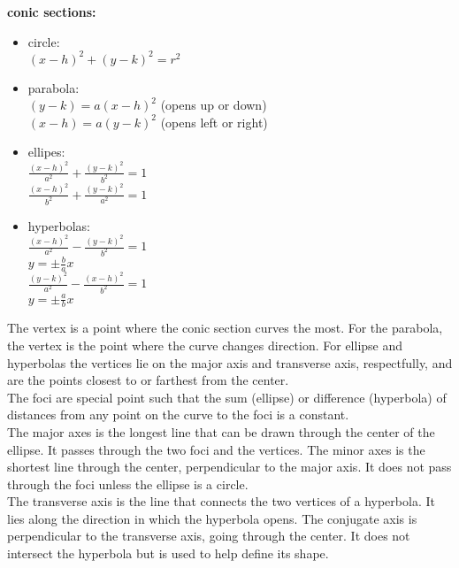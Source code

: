 \documentclass{article}
\begin{document}
\textbf{conic sections:}\\
	\begin{itemize}
		\item circle:\\ 
			$(x - h)^2 + (y - k)^2 = r^2$
		\item parabola:\\
			$(y - k) = a(x - h)^2$ (opens up or down)\\
			$(x - h) = a(y - k)^2$ (opens left or right)
		\item ellipes:\\
			$\frac{(x - h)^2}{a^2} + \frac{(y - k)^2}{b^2} = 1$\\
			$\frac{(x - h)^2}{b^2} + \frac{(y - k)^2}{a^2} = 1$\\
		\item hyperbolas:\\
			$\frac{(x - h)^2}{a^2} - \frac{(y - k)^2}{b^2} = 1$\\
			$y = \pm \frac{b}{a}x$\\
			$\frac{(y - k)^2}{a^2} - \frac{(x - h)^2}{b^2} = 1$\\
			$y = \pm \frac{a}{b}x$	
	\end{itemize}

The vertex is a point where the conic section curves the most. For the parabola, the vertex is the point where the curve changes direction. For ellipse and hyperbolas the vertices lie on the major axis and transverse axis, respectfully, and are the points closest to or farthest from the center.\\

The foci are special point such that the sum (ellipse) or difference (hyperbola) of distances from any point on the curve to the foci is a constant.\\

The major axes is the longest line that can be drawn through the center of the ellipse. It passes through the two foci and the vertices. The minor axes is the shortest line through the center, perpendicular to the major axis. It does not pass through the foci unless the ellipse is a circle.\\

The transverse axis is the line that connects the two vertices of a hyperbola. It lies along the direction in which the hyperbola opens. The conjugate axis is perpendicular to the transverse axis, going through the center. It does not intersect the hyperbola but is used to help define its shape.\\
\end{document}
